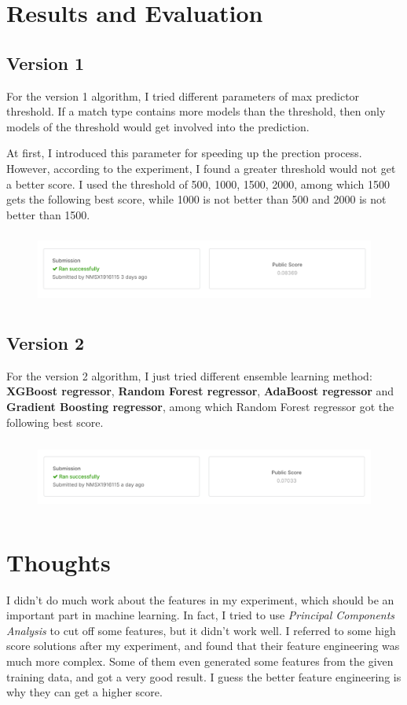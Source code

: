 \documentclass[journal=jacsat,manuscript=article]{achemso}
\begin{document}
\section{Results and Evaluation}

\subsection{Version 1}

For the version 1 algorithm, I tried different parameters of max predictor threshold.
If a match type contains more models than the threshold, then only models of the
threshold would get involved into the prediction.

At first, I introduced this parameter for speeding up the prection process. However,
according to the experiment, I found a greater threshold would not get a better score.
I used the threshold of 500, 1000, 1500, 2000, among which 1500 gets the following best score,
while 1000 is not better than 500 and 2000 is not better than 1500.

\begin{figure}
  \includegraphics[height=2.4cm]{img/res-version-1.png}
\end{figure}

\subsection{Version 2}

For the version 2 algorithm, I just tried different ensemble learning method:
\textbf{XGBoost regressor}, \textbf{Random Forest regressor}, \textbf{AdaBoost regressor}
and \textbf{Gradient Boosting regressor}, among which Random Forest regressor 
got the following best score.

\begin{figure}
  \includegraphics[height=2.4cm]{img/res-version-2.png}
\end{figure}


\section{Thoughts}

I didn't do much work about the features in my experiment,
which should be an important part in machine learning.
In fact, I tried to use \emph{Principal Components Analysis} to cut off some features, 
but it didn't work well. I referred to some high score solutions after my experiment,
and found that their feature engineering was much more complex.
Some of them even generated some features from the given training data,
and got a very good result.
I guess the better feature engineering is why they can get a higher score.
\end{document}
